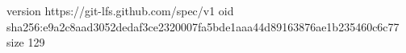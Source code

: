 version https://git-lfs.github.com/spec/v1
oid sha256:e9a2c8aad3052dedaf3ce2320007fa5bde1aaa44d89163876ae1b235460c6c77
size 129
